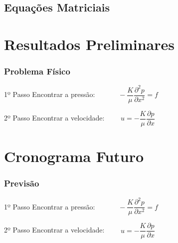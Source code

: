 \documentclass{beamer}
\begin{document}
\subsection{Equações Matriciais}
\begin{frame}
\end{frame}


\section{Resultados Preliminares}
\begin{frame}
\frametitle{Problema Físico}
\begin{block}{1º Passo}
Encontrar a pressão: $\qquad \quad -\dfrac{K}{\mu}\dfrac{\partial^2 p}{\partial x^2}=f$
\end{block}

\begin{block}{2º Passo}
Encontrar a velocidade: $\qquad u=-\dfrac{K}{\mu}\dfrac{\partial p}{\partial x}$
\end{block}
\end{frame}

\section{Cronograma Futuro}
\begin{frame}
\frametitle{Previsão}
\begin{block}{1º Passo}
Encontrar a pressão: $\qquad \quad -\dfrac{K}{\mu}\dfrac{\partial^2 p}{\partial x^2}=f$
\end{block}

\begin{block}{2º Passo}
Encontrar a velocidade: $\qquad u=-\dfrac{K}{\mu}\dfrac{\partial p}{\partial x}$
\end{block}
\end{frame}
\end{document}
